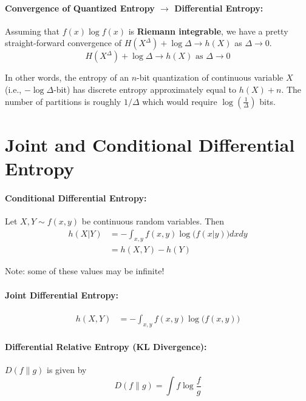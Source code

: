\documentclass[a4paper,12pt]{report}
\begin{document}
\paragraph{Convergence of Quantized Entropy $\to$ Differential Entropy: }
Assuming that $f(x)\log f(x)$ is \textbf{Riemann integrable}, we have a pretty
straight-forward convergence of $H(X^\Delta) + \log \Delta \to h(X)$ as $\Delta \to 0$.
\begin{equation}
	H(X^\Delta) + \log \Delta \to h(X) \text{  as } \Delta \to 0
\end{equation}

In other words, the entropy of an $n$-bit quantization of continuous variable
$X$ (i.e., $-\log \Delta$-bit) has discrete entropy approximately equal to $h(X)
+ n$. The number of partitions is roughly $1/\Delta$ which would require $\log
(\frac 1 {\Delta})$ bits.









\section{Joint and Conditional Differential Entropy}

\paragraph{Conditional Differential Entropy: } Let $X, Y \sim f(x,y)$ be
continuous random variables. Then 
\begin{align}
	h(X|Y) &= - \int_{x,y} f(x,y) \log\big( f(x|y) \big) dx dy \\
		   &= h(X,Y) - h(Y)
\end{align}

Note: some of these values may be infinite!


\paragraph{Joint Differential Entropy: } 
\begin{align}
	h(X,Y) &= - \int_{x,y} f(x,y) \log \big( f(x,y)\big)
\end{align}



\paragraph{Differential Relative Entropy (KL Divergence): } $D(f \| g)$ is given
by 
\begin{equation}
	D(f \| g) = \int f \log \frac{f}{g} 
\end{equation}
\end{document}
